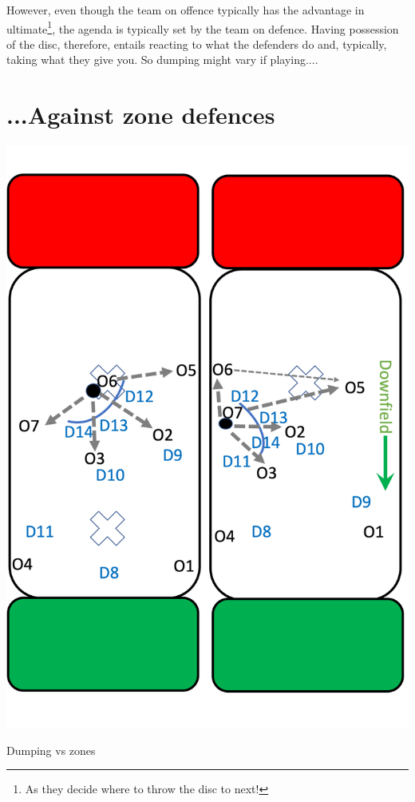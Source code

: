 \documentclass{tufte-handout}
\begin{document}
However, 
even though 
the team on offence 
typically
has the advantage 
in ultimate\footnote{
As they decide 
where 
to throw the disc 
to next!}, 
the agenda is 
typically set 
by the team 
on defence. 
Having possession 
of the disc, 
therefore, 
entails 
reacting 
to what 
the defenders 
do and, 
typically, 
taking what they give you. 
So dumping 
might vary if playing.... 


\section{...Against zone defences}


\begin{marginfigure}%
  \includegraphics[width=\linewidth]{dump_zone}
 \caption{Dumping vs zones}
 \label{fig:dump_zone}
 \end{marginfigure}
\end{document}
